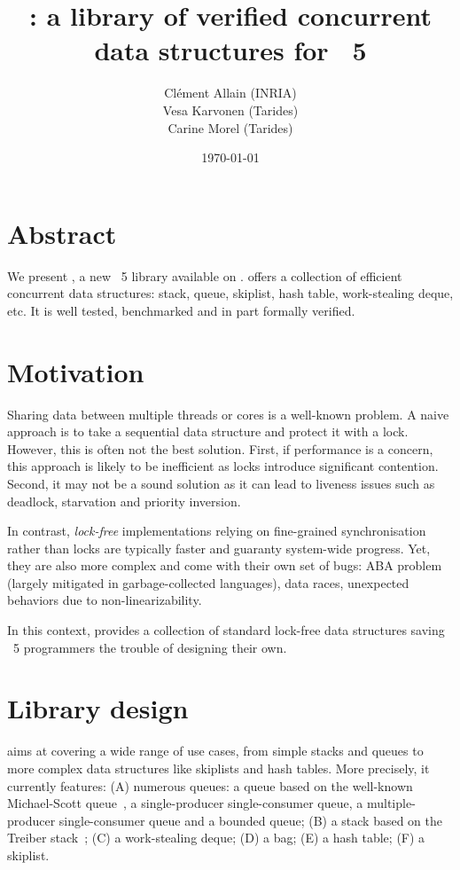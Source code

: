 \documentclass[a4paper, 11pt]{article}
\title{\Saturn: a library of verified concurrent data structures for \OCaml~5}
\date{\today}
\author{
  Clément Allain (INRIA) \\
  Vesa Karvonen (Tarides) \\
  Carine Morel (Tarides)
}
\begin{document}
\maketitle

\section{Abstract}

We present \Saturn, a new \OCaml~5 library available on \opam.
\Saturn offers a collection of efficient concurrent data structures: stack, queue, skiplist, hash table, work-stealing deque, etc.
It is well tested, benchmarked and in part formally verified.

\section{Motivation}

Sharing data between multiple threads or cores is a well-known problem.
A naive approach is to take a sequential data structure and protect it with a lock.
However, this is often not the best solution.
First, if performance is a concern, this approach is likely to be inefficient as locks introduce significant contention.
Second, it may not be a sound solution as it can lead to liveness issues such as deadlock, starvation and priority inversion.

In contrast, \emph{lock-free} implementations relying on fine-grained synchronisation rather than locks are typically faster and guaranty system-wide progress.
Yet, they are also more complex and come with their own set of bugs: ABA problem (largely mitigated in garbage-collected languages), data races, unexpected behaviors due to non-linearizability.

In this context, \Saturn provides a collection of standard lock-free data structures saving \OCaml~5 programmers the trouble of designing their own.

\section{Library design}

\Saturn aims at covering a wide range of use cases, from simple stacks and queues to more complex data structures like skiplists and hash tables.
More precisely, it currently features:
(A) numerous queues: a queue based on the well-known Michael-Scott queue~\cite{michael1996simple}, a single-producer single-consumer queue, a multiple-producer single-consumer queue and a bounded queue;
(B) a stack based on the Treiber stack~\cite{treiber1986systems};
(C) a work-stealing deque;
(D) a bag;
(E) a hash table;
(F) a skiplist.
\end{document}
